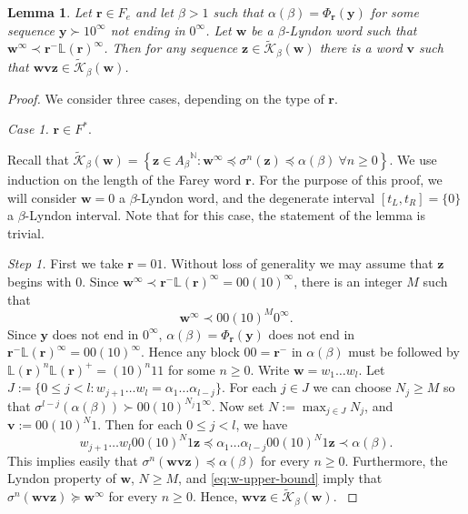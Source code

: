 \documentclass[11pt]{amsart}
\newtheorem{lemma}[theorem]{Lemma}
\theoremstyle{definition}
\theoremstyle{remark}
\numberwithin{equation}{section}
\newcommand{\N}{\ensuremath{\mathbb{N}}}
\renewcommand{\L}{\ensuremath{\mathbb{L}}}
\newcommand{\Kt}{\widetilde{\mathcal{K}}}
\renewcommand{\r}{ {\mathbf{r}}}
\renewcommand{\v}{\mathbf{v}}
\newcommand{\w}{\mathbf{w}}
\newcommand{\y}{\mathbf{y}}
\newcommand{\z}{\mathbf{z}}
\newcommand{\set}[1]{\left\{#1\right\}}
\newcommand{\f}{\infty}
\newcommand{\al}{\alpha}
\newcommand{\lle}{\preccurlyeq}
\newcommand{\lge}{\succcurlyeq}
\newcommand{\si}{\sigma}
\begin{document}
\begin{lemma} \label{lem:general-connecting-w}
Let $\r\in{F_e}$ and let $\beta{>1}$ such that $\alpha(\beta)=\Phi_\r(\y)$ for some sequence $\y\succ 10^\f$ {not ending in $0^\f$}.
Let $\w$ be a $\beta$-Lyndon word such that $\w^\f\prec \r^-\L(\r)^\f$. Then for any sequence $\z\in\Kt_\beta(\w)$ there is a word $\v$ such that $\w\v\z\in \Kt_\beta(\w)$.
\end{lemma}

\begin{proof}
{ We consider three cases, depending on the type of $\r$.

{\em Case 1.} $\r\in F^*$.}
{Recall that 
$
\Kt_\beta(\w)=\set{\z\in{A_\beta}^\N: \w^\f\lle \si^n(\z)\lle \al(\beta)~\forall n\ge 0}.
$}
We use induction on the length of the Farey word $\r$. For the purpose of this proof, we will consider $\w=0$ a $\beta$-Lyndon word, and the degenerate interval $[t_L,t_R]=\{0\}$ a $\beta$-Lyndon interval. Note that for this case, the statement of the lemma is trivial.

\medskip
{\em Step 1.} First we take $\r=01$. Without loss of generality we may assume that $\z$ begins with $0$. Since $\w^\f\prec \r^-\L(\r)^\f=00(10)^\f$, there is an integer $M$ such that
\begin{equation} \label{eq:w-upper-bound}
\w^\f\prec 00(10)^M 0^\f.
\end{equation}
{
Since $\y$ does not end in $0^\f$, $\alpha(\beta)=\Phi_\r(\y)$ does not end in $\r^-\L(\r)^\f=00(10)^\f$. Hence any block $00=\r^-$ in $\al(\beta)$ must be followed by $\L(\r)^n\L(\r)^+=(10)^n11$ for some $n\geq 0$. Write $\w=w_1\dots w_l$. Let $J:=\{0\leq j<l: w_{j+1}\dots w_l=\al_1\dots\al_{l-j}\}$. 
For each $j\in J$ we can choose $N_j\geq M$ so that $\si^{l-j}(\al(\beta))\succ 00(10)^{N_j}1^\f$. Now set $N:=\max_{j\in J} N_j$, and $\v:=00(10)^N 1$. Then for each $0\leq j<l$, we have 
\[w_{j+1}\dots w_l00(10)^N1\z\lle \al_1\dots\al_{l-j}00(10)^N1\z\prec\al(\beta).\]
 This implies easily that $\si^n(\w\v\z)\lle\al(\beta)$ for every $n\geq 0$. Furthermore, the Lyndon property of $\w$, $N\geq M$, and \eqref{eq:w-upper-bound} imply that $\si^n(\w\v\z)\lge\w^\f$ for every $n\geq 0$. Hence, $\w\v\z\in \Kt_\beta(\w)$.
}


\end{proof}
\end{document}
